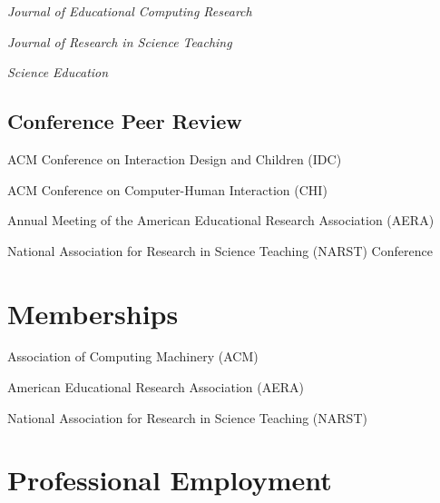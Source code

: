 \documentclass[11pt,letterpaper]{report} %
\newcommand{\listitemspace}{0.25em}
\renewenvironment{itemize}
{\begin{list}{}{\setlength{\leftmargin}{0em}
                \setlength{\parskip}{0em}
                \setlength{\itemsep}{\listitemspace}
                \setlength{\parsep}{\listitemspace}}}
{\end{list}}
\begin{document}
    \begin{itemize}

        \item \textit{Journal of Educational Computing Research}
        \item \textit{Journal of Research in Science Teaching}
        \item \textit{Science Education}


    \end{itemize}


    \subsection*{Conference Peer Review}

    \begin{itemize}

        \item ACM Conference on Interaction Design and Children (IDC)
        \item ACM Conference on Computer-Human Interaction (CHI)
        \item Annual Meeting of the American Educational Research Association (AERA)%
        \item National Association for Research in Science Teaching (NARST) Conference

    \end{itemize}



    \section*{Memberships}

    \begin{itemize}

        \item Association of Computing Machinery (ACM)
        \item American Educational Research Association (AERA)
        \item National Association for Research in Science Teaching (NARST)

    \end{itemize}



    \section*{Professional Employment}
\end{document}

